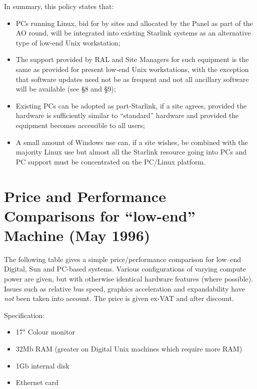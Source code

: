 In summary, this policy states that:
\begin{itemize}
\item   PCs running Linux, bid for by sites and allocated by the Panel 
        as part of the
        AO round, will be integrated into existing Starlink systems as an
        alternative type of low-end Unix workstation;
\item   The support provided by RAL and Site Managers for such equipment
        is the same as provided for present low-end Unix workstations, with
        the exception that software updates need not be as frequent and
        not all ancillary software will be available (see \S 8 and \S 9);
\item   Existing PCs can be adopted as part-Starlink, if a site
        agrees, provided the hardware is sufficiently similar to
       ``standard'' hardware and provided the equipment becomes
        accessible to all users;
\item   A small amount of Windows use can, if a site wishes, be
        combined with the majority Linux use but almost all the Starlink 
        resource going into PCs and PC support must be concentrated on the 
        PC/Linux platform.
\end{itemize}
 
\newpage

\appendix

\section{Price and Performance Comparisons for ``low-end'' Machine (May 1996)}

The following table gives a simple price/performance comparison for
low--end Digital, Sun and PC-based systems. Various configurations of
varying compute power are given, but with otherwise identical hardware
features (where possible). Issues such as relative bus speed,
graphics acceleration and expandability have {\em not} been taken into
account. The price is given ex-VAT and after discount.

Specification:
\begin{itemize}
\item 17" Colour monitor
\item 32Mb RAM (greater on Digital Unix machines which require more RAM)
\item 1Gb internal disk
\item Ethernet card
\end{itemize}
 
